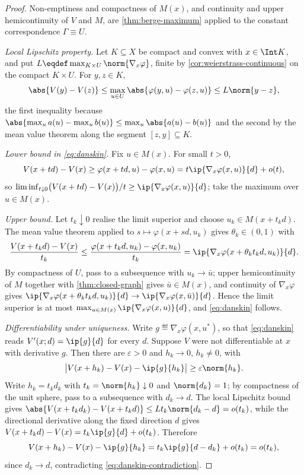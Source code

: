 \begin{proof}
	Non-emptiness and compactness of $M(x)$, and continuity and upper
	hemicontinuity of $V$ and $M$, are \autoref{thm:berge-maximum} applied to the
	constant correspondence $\Gamma\equiv U$.

	\emph{Local Lipschitz property.} Let $K\subseteq X$ be compact and convex with
	$x\in\Int K$, and put $L\eqdef\max_{K\times U}\norm{\nabla_{x}\varphi}$, finite
	by \autoref{cor:weierstrass-continuous} on the compact $K\times U$. For
	$y,z\in K$,
	\[
		\abs{V(y)-V(z)}\leq\max_{u\in U}\abs{\varphi(y,u)-\varphi(z,u)}\leq L\norm{y-z},
	\]
	the first inequality because $\abs{\max_ua(u)-\max_ub(u)}\leq\max_u\abs{a(u)-b(u)}$
	and the second by the mean value theorem along the segment $[z,y]\subseteq K$.

	\emph{Lower bound in \eqref{eq:danskin}.} Fix $u\in M(x)$. For small $t>0$,
	\[
		V(x+td)-V(x)\geq\varphi(x+td,u)-\varphi(x,u)
		=t\ip{\nabla_{x}\varphi(x,u)}{d}+o(t),
	\]
	so $\liminf_{t\downarrow0}\bigl(V(x+td)-V(x)\bigr)/t
		\geq\ip{\nabla_{x}\varphi(x,u)}{d}$; take the maximum over $u\in M(x)$.

	\emph{Upper bound.} Let $t_k\downarrow0$ realise the limit superior and choose
	$u_k\in M(x+t_kd)$. The mean value theorem applied to
	$s\mapsto\varphi(x+sd,u_k)$ gives $\theta_k\in(0,1)$ with
	\[
		\frac{V(x+t_kd)-V(x)}{t_k}\leq\frac{\varphi(x+t_kd,u_k)-\varphi(x,u_k)}{t_k}
		=\ip{\nabla_{x}\varphi(x+\theta_kt_kd,u_k)}{d}.
	\]
	By compactness of $U$, pass to a subsequence with $u_k\to\bar u$; upper
	hemicontinuity of $M$ together with \autoref{thm:closed-graph} gives
	$\bar u\in M(x)$, and continuity of $\nabla_{x}\varphi$ gives
	$\ip{\nabla_{x}\varphi(x+\theta_kt_kd,u_k)}{d}\to
		\ip{\nabla_{x}\varphi(x,\bar u)}{d}$. Hence the limit superior is at most
	$\max_{u\in M(x)}\ip{\nabla_{x}\varphi(x,u)}{d}$, and \eqref{eq:danskin}
	follows.

	\emph{Differentiability under uniqueness.} Write $g\eqdef\nabla_{x}\varphi(x,u^{\ast})$,
	so that \eqref{eq:danskin} reads $V'(x;d)=\ip{g}{d}$ for every $d$. Suppose $V$
	were not differentiable at $x$ with derivative $g$. Then there are
	$\varepsilon>0$ and $h_k\to0$, $h_k\neq0$, with
	\begin{equation}\label{eq:danskin-contradiction}
		\bigl\lvert V(x+h_k)-V(x)-\ip{g}{h_k}\bigr\rvert\geq\varepsilon\norm{h_k}.
	\end{equation}
	Write $h_k=t_kd_k$ with $t_k=\norm{h_k}\downarrow0$ and $\norm{d_k}=1$; by
	compactness of the unit sphere, pass to a subsequence with $d_k\to d$. The
	local Lipschitz bound gives
	$\abs{V(x+t_kd_k)-V(x+t_kd)}\leq Lt_k\norm{d_k-d}=o(t_k)$, while the
	directional derivative along the fixed direction $d$ gives
	$V(x+t_kd)-V(x)=t_k\ip{g}{d}+o(t_k)$. Therefore
	\[
		V(x+h_k)-V(x)-\ip{g}{h_k}
		=t_k\ip{g}{d-d_k}+o(t_k)=o(t_k),
	\]
	since $d_k\to d$, contradicting \eqref{eq:danskin-contradiction}.
\end{proof}


